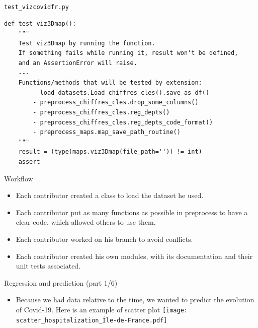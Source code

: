 \documentclass[
  ignorenonframetext,
]{beamer}
\providecommand{\tightlist}{%
  \setlength{\itemsep}{0pt}\setlength{\parskip}{0pt}}
\begin{document}
\begin{frame}[fragile]{\texttt{test\_vizcovidfr.py}}
\protect\hypertarget{test_vizcovidfr.py}{}
\begin{verbatim}
def test_viz3Dmap():
    """
    Test viz3Dmap by running the function.
    If something fails while running it, result won't be defined,
    and an AssertionError will raise.
    ---
    Functions/methods that will be tested by extension:
        - load_datasets.Load_chiffres_cles().save_as_df()
        - preprocess_chiffres_cles.drop_some_columns()
        - preprocess_chiffres_cles.reg_depts()
        - preprocess_chiffres_cles.reg_depts_code_format()
        - preprocess_maps.map_save_path_routine()
    """
    result = (type(maps.viz3Dmap(file_path='')) != int)
    assert
\end{verbatim}
\end{frame}

\begin{frame}{Workflow}
\protect\hypertarget{workflow}{}
\begin{itemize}
\tightlist
\item
  Each contributor created a class to load the dataset he used. \pause
\item
  Each contributor put as many functions as possible in preprocess to
  have a clear code, which allowed others to use them. \pause
\item
  Each contributor worked on his branch to avoid conflicts. \pause
\item
  Each contributor created his own modules, with its documentation and
  their unit tests associated.
\end{itemize}
\end{frame}

\begin{frame}{Regression and prediction (part 1/6)}
\protect\hypertarget{regression-and-prediction-part-16}{}
\begin{itemize}
\tightlist
\item
  Because we had data relative to the time, we wanted to predict the
  evolution of Covid-19. \pause Here is an example of scatter plot
  \pause \texttt{[image: scatter\_hospitalization\_Île-de-France.pdf]}
\end{itemize}
\end{frame}
\end{document}
